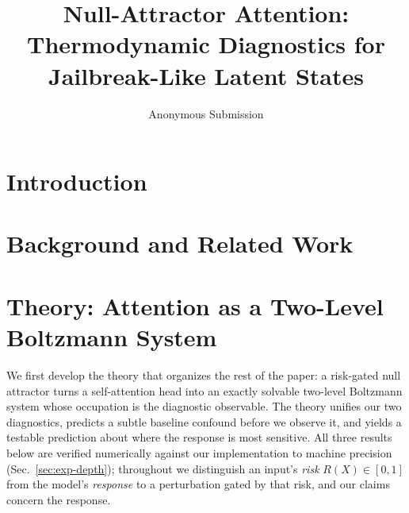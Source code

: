 \documentclass[letterpaper]{article} %
\title{Null-Attractor Attention: Thermodynamic Diagnostics for Jailbreak-Like Latent States}
\author{
    Anonymous Submission
}
\begin{document}
\maketitle

\begin{abstract}
\end{abstract}


\section{Introduction}

\section{Background and Related Work}
\label{sec:related}

\section{Theory: Attention as a Two-Level Boltzmann System}
\label{sec:theory}

We first develop the theory that organizes the rest of the paper: a risk-gated null attractor
turns a self-attention head into an exactly solvable two-level Boltzmann system whose occupation
is the diagnostic observable. The theory unifies our two diagnostics, predicts a subtle baseline
confound before we observe it, and yields a testable prediction about where the response is most
sensitive. All three results below are verified numerically against our implementation to machine
precision (Sec.~\ref{sec:exp-depth}); throughout we distinguish an input's \emph{risk}
$R(X)\in[0,1]$ from the model's \emph{response} to a perturbation gated by that risk, and our
claims concern the response.
\end{document}
